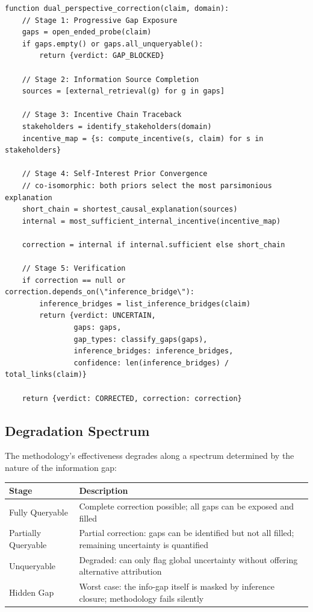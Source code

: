 \begin{small}
\begin{verbatim}
function dual_perspective_correction(claim, domain):
    // Stage 1: Progressive Gap Exposure
    gaps = open_ended_probe(claim)
    if gaps.empty() or gaps.all_unqueryable():
        return {verdict: GAP_BLOCKED}

    // Stage 2: Information Source Completion
    sources = [external_retrieval(g) for g in gaps]

    // Stage 3: Incentive Chain Traceback
    stakeholders = identify_stakeholders(domain)
    incentive_map = {s: compute_incentive(s, claim) for s in stakeholders}

    // Stage 4: Self-Interest Prior Convergence
    // co-isomorphic: both priors select the most parsimonious explanation
    short_chain = shortest_causal_explanation(sources)
    internal = most_sufficient_internal_incentive(incentive_map)
    
    correction = internal if internal.sufficient else short_chain

    // Stage 5: Verification
    if correction == null or correction.depends_on(\"inference_bridge\"):
        inference_bridges = list_inference_bridges(claim)
        return {verdict: UNCERTAIN,
                gaps: gaps,
                gap_types: classify_gaps(gaps),
                inference_bridges: inference_bridges,
                confidence: len(inference_bridges) / total_links(claim)}

    return {verdict: CORRECTED, correction: correction}
\end{verbatim}
\end{small}

\subsection{Degradation Spectrum}

The methodology's effectiveness degrades along a spectrum determined by the 
nature of the information gap:

\begin{center}
\begin{tabular}{lp{}}
\toprule
\textbf{Stage} & \textbf{Description} \\
\midrule
Fully Queryable & Complete correction possible; all gaps can be exposed and filled \\
Partially Queryable & Partial correction: gaps can be identified but not all filled; remaining uncertainty is quantified \\
Unqueryable & Degraded: can only flag global uncertainty without offering alternative attribution \\
Hidden Gap & Worst case: the info-gap itself is masked by inference closure; methodology fails silently \\
\bottomrule
\end{tabular}
\end{center}

